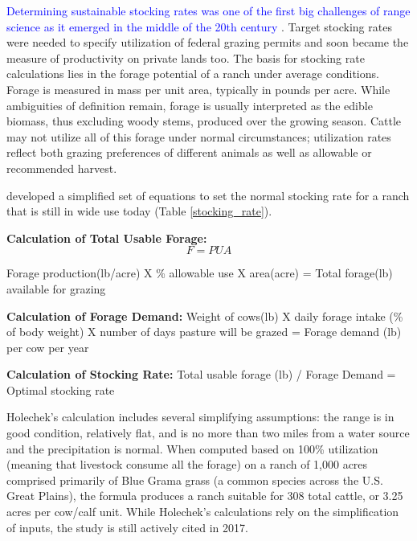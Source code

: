 \documentclass[11pt]{article}
\begin{document}
\textcolor{blue}{Determining sustainable stocking rates was one of the first big challenges of range science as it emerged in the middle of the 20th century} \citep{Bement1969, Harlan1958, Thomas2015, Paterson2012, Reppert1960, Fleischner1994}. Target stocking rates were needed to specify utilization of federal grazing permits and soon became the measure of productivity on private lands too. The basis for stocking rate calculations lies in the forage potential of a ranch under average conditions.
Forage is measured in mass per unit area, typically in pounds per acre. While ambiguities of definition remain, forage is usually interpreted as the edible biomass, thus excluding woody stems, produced over the growing season. 
Cattle may not utilize all of this forage under normal circumstances; utilization rates reflect both grazing preferences of different animals as well as allowable or recommended harvest. \citep{Holechek1999, Redfearn2000}

\citet{Holechek1988} developed a simplified set of equations to set the normal stocking rate for a ranch that is still in wide use today (Table \ref{stocking_rate}).

\textbf{Calculation of Total Usable Forage:}
\begin{equation}
F = P U A
\end{equation}

Forage production(lb/acre) X \% allowable use X area(acre) = Total forage(lb) available for grazing

\textbf{Calculation of Forage Demand:}
Weight of cows(lb) X daily forage intake (\% of body weight) X number of days pasture will be grazed = Forage demand (lb) per cow per year

\textbf{Calculation of Stocking Rate:}
Total usable forage (lb) / Forage Demand = Optimal stocking rate

Holechek’s calculation includes several simplifying assumptions: the range is in good condition, relatively flat, and is no more than two miles from a water source and the precipitation is normal. When computed based on 100\% utilization (meaning that livestock consume all the forage)
 on a ranch of 1,000 acres comprised primarily of Blue Grama grass (a common species across the U.S. Great Plains), the formula produces a ranch suitable for 308 total cattle, or 3.25 acres per cow/calf unit. While Holechek’s calculations rely on the simplification of inputs, the study is still actively cited in 2017.
\end{document}
